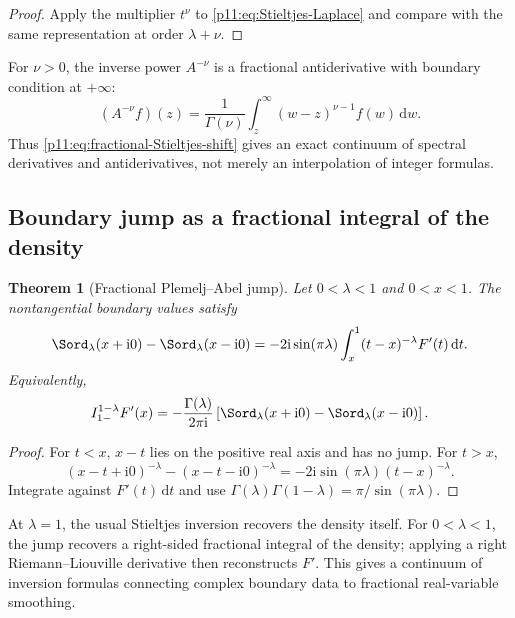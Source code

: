 \documentclass[11pt,oneside]{article}
\newtheorem{theorem}{Theorem}[section]
\theoremstyle{definition}
\theoremstyle{remark}
\newcommand{\dd}{\,\mathrm d}
\newcommand{\ii}{\mathrm i}
\newcommand{\1}{\mathbf 1}
\begin{document}
\begin{proof}
Apply the multiplier $t^\nu$ to \eqref{p11:eq:Stieltjes-Laplace} and compare with
the same representation at order $\lambda+\nu$.
\end{proof}

For $\nu>0$, the inverse power $A^{-\nu}$ is a fractional antiderivative with
boundary condition at $+\infty$:
\begin{equation}
 (A^{-\nu}f)(z)
 =\frac1{\Gamma(\nu)}\int_z^\infty(w-z)^{\nu-1}f(w)\dd w.
 \label{p11:eq:right-infinity-antiderivative}
\end{equation}
Thus \eqref{p11:eq:fractional-Stieltjes-shift} gives an exact continuum of
spectral derivatives and antiderivatives, not merely an interpolation of
integer formulas.

\subsection{Boundary jump as a fractional integral of the density}

\begin{theorem}[Fractional Plemelj--Abel jump]
\label{p11:thm:Stieltjes-jump}
Let $0<\lambda<1$ and $0<x<1$.  The nontangential boundary values satisfy
\begin{equation}
 \Sord_\lambda(x+\ii0)-\Sord_\lambda(x-\ii0)
 =-2\ii\sin(\pi\lambda)
  \int_x^1(t-x)^{-\lambda}F'(t)\dd t.
 \label{p11:eq:Stieltjes-jump}
\end{equation}
Equivalently,
\begin{equation}
 I_{1-}^{1-\lambda}F'(x)
 =-\frac{\Gamma(\lambda)}{2\pi\ii}
  \left[\Sord_\lambda(x+\ii0)-\Sord_\lambda(x-\ii0)\right].
 \label{p11:eq:fractional-Stieltjes-inversion}
\end{equation}
\end{theorem}

\begin{proof}
For $t<x$, $x-t$ lies on the positive real axis and has no jump.  For $t>x$,
\begin{equation}
 (x-t+\ii0)^{-\lambda}-(x-t-\ii0)^{-\lambda}
 =-2\ii\sin(\pi\lambda)(t-x)^{-\lambda}.
\end{equation}
Integrate against $F'(t)\dd t$ and use
$\Gamma(\lambda)\Gamma(1-\lambda)=\pi/\sin(\pi\lambda)$.
\end{proof}

At $\lambda=1$, the usual Stieltjes inversion recovers the density itself.
For $0<\lambda<1$, the jump recovers a right-sided fractional integral of the
density; applying a right Riemann--Liouville derivative then reconstructs
$F'$.  This gives a continuum of inversion formulas connecting complex
boundary data to fractional real-variable smoothing.
\end{document}
